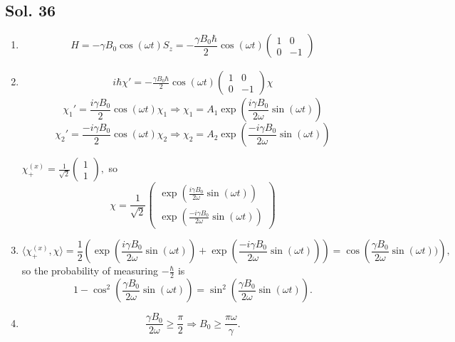        \subsection*{Sol. 36}
       \begin{enumerate}
           \item $$
           H = -\gamma B_0\cos(\omega t)S_z
           =-\frac{\gamma B_0\hbar}{2}
           \cos(\omega t)
           \begin{pmatrix}
               1 & 0 \\
               0 & -1
           \end{pmatrix}
           $$
           \item 
           \begin{align*}
               i\hbar \chi' = 
               -\frac{\gamma B_0\hbar}{2}
           \cos(\omega t)
           \begin{pmatrix}
               1 & 0 \\
               0 & -1
           \end{pmatrix}
           \chi
           \end{align*}
           $$
           \chi_1'=
           \frac{i\gamma B_0}{2}
           \cos(\omega t)\chi_1
           \Rightarrow
           \chi_1 = A_1\exp(\frac{i\gamma B_0}{2\omega}\sin(\omega t))
           $$
           $$
           \chi_2'=
           \frac{-i\gamma B_0}{2}
           \cos(\omega t)\chi_2
           \Rightarrow
           \chi_2 = A_2\exp(\frac{-i\gamma B_0}{2\omega}\sin(\omega t))
           $$

           $\chi_+^{(x)}=
           \frac{1}{\sqrt{2}}
           \begin{pmatrix}
               1\\1
           \end{pmatrix},$
           so
           $$
           \chi =
           \frac{1}{\sqrt{2}}
            \begin{pmatrix}
                \exp(\frac{i\gamma B_0}{2\omega}\sin(\omega t)) \\
                \exp(\frac{-i\gamma B_0}{2\omega}\sin(\omega t))
            \end{pmatrix}
           $$
           \item 
           $$
           \langle \chi_+^{(x)}, \chi\rangle
           =\frac{1}{2}(\exp(\frac{i\gamma B_0}{2\omega}\sin(\omega t)) + 
           \exp(\frac{-i\gamma B_0}{2\omega}\sin(\omega t)))
           =\cos\left(\frac{\gamma B_0}{2\omega}\sin(\omega t))\right),
           $$
           so the probability of measuring $-\frac{\hbar}{2}$ is 
           $$
           1-\cos^2\left(\frac{\gamma B_0}{2\omega}\sin(\omega t)\right)
           =\sin^2\left(\frac{\gamma B_0}{2\omega}\sin(\omega t)\right).
           $$
           \item 
            $$
            \frac{\gamma B_0}{2\omega}\geq \frac{\pi}{2}
            \Rightarrow B_0\geq \frac{\pi\omega}{\gamma}.
            $$  
       \end{enumerate}

